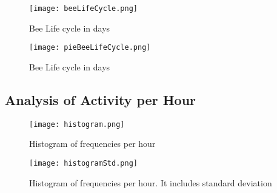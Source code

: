 \documentclass[11pt,fleqn]{book} %
\begin{document}
%


\begin{figure}[h!]%
\centering%
\texttt{[image: beeLifeCycle.png]}%
\caption{Bee Life cycle in days}%
\end{figure}

%


\begin{figure}[h!]%
\centering%
\texttt{[image: pieBeeLifeCycle.png]}%
\caption{Bee Life cycle in days}%
\end{figure}

%
\subsection*{Analysis of Activity per Hour}%


\begin{figure}[h!]%
\centering%
\texttt{[image: histogram.png]}%
\caption{Histogram of frequencies per hour}%
\end{figure}

%


\begin{figure}[h!]%
\centering%
\texttt{[image: histogramStd.png]}%
\caption{Histogram of frequencies per hour. It includes standard deviation}%
\end{figure}
\end{document}
